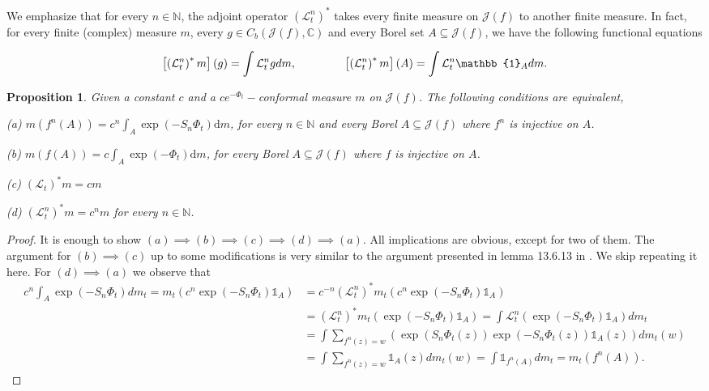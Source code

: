 \documentclass[12pt,reqno]{amsart}
\newtheorem{proposition}[theorem]{Proposition}
\begin{document}
\noindent We emphasize that for every $n \in \mathbb{N}$, the adjoint operator $\left(\mathcal{L}_t^n \right)^*$ takes every finite measure on $\mathcal{J}(f)$ to another finite measure. In fact, for every finite (complex) measure $m$, every $g \in C_b(\mathcal{J}(f),\mathbb{C})$ and every Borel set $A\subseteq \mathcal{J}(f)$, we have the following functional equations

$$\left[\left(\mathcal{L}_t^n \right)^*m \right](g)=\int \mathcal{L}_t^n g dm, \hspace{1.5cm} \left[\left(\mathcal{L}_t^n \right)^*m \right](A)=\int \mathcal{L}_t^n \mathbb{1}_A dm.$$
\begin{proposition}\label{equivalence of eigenmeasure and conformal measure}
     Given a constant $c$ and a $ce^{-\Phi_t}-$conformal measure $m$ on $\mathcal{J}(f)$. The following conditions are equivalent,
     
    (a) $m(f^n(A))=c^n\int_A\exp(-S_n\Phi_t)\text{d}m$, for every $n\in \mathbb{N}$ and every Borel $A\subseteq \mathcal{J}(f)$ where $f^n$ is injective on $A$.

    (b) $m(f(A))=c\int_A\exp(-\Phi_t)\text{d}m$, for every Borel $A\subseteq \mathcal{J}(f)$ where $f$ is injective on $A$.

    (c) $\left(\mathcal{L}_t \right)^*m=cm$

    (d) $\left(\mathcal{L}_t^n \right)^*m=c^nm$ for every $n\in \mathbb{N}$.
\end{proposition}
\begin{proof}
    It is enough to show $(a) \implies (b) \implies (c) \implies (d) \implies (a).$ All implications are obvious, except for two of them. The argument for $(b) \implies(c)$ up to some modifications is very similar to the argument presented in lemma 13.6.13 in \citep[p. 465]{Munday}. We skip repeating it here. For $(d) \implies (a)$ we observe that
    \begin{align*}
        c^n\int_A \exp(-S_n\Phi_t)dm_t=m_t\left(c^n\exp(-S_n\Phi_t) \mathbb{1}_A \right)&=c^{-n}\left(\mathcal{L}_t^n \right)^*m_t\left(c^n\exp(-S_n\Phi_t) \mathbb{1}_A \right)\\
        &=\left(\mathcal{L}_t^n \right)^*m_t\left(\exp(-S_n\Phi_t) \mathbb{1}_A \right)=\int \mathcal{L}_t^n \left( \exp(-S_n\Phi_t) \mathbb{1}_A \right)dm_t\\
        &=\int \sum_{f^n(z)=w} \left( \exp \left(S_n\Phi_t(z) \right)\exp \left(-S_n\Phi_t(z) \right)\mathbb{1}_A(z)\right)dm_t(w)\\
        &=\int \sum_{f^n(z)=w} \mathbb{1}_A(z)dm_t(w)=\int \mathbb{1}_{f^n(A)}dm_t=m_t(f^n(A)).
    \end{align*}    
    
\end{proof}
\end{document}
